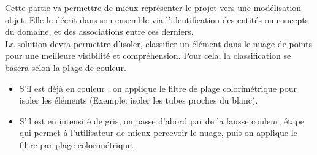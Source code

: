 \documentclass[12pt,titlepage,french]{article}
\begin{document}
Cette partie va permettre de mieux représenter le projet vers une modélisation objet. Elle le décrit dans son ensemble via l'identification des entités ou concepts du domaine, et des associations entre ces derniers. \\

La solution devra permettre d’isoler, classifier un élément dans le nuage de points pour une meilleure visibilité et compréhension. Pour cela, la classification se basera selon la plage de couleur.\\

\begin{itemize}
	\item  S'il est déjà en couleur : on applique le filtre de plage colorimétrique pour isoler les éléments (Exemple: isoler les tubes proches du blanc).\par

	\item  S'il est en intensité de gris, on passe d'abord par de la fausse couleur, étape qui permet à l'utilisateur de mieux percevoir le nuage, puis on applique le filtre par plage colorimétrique.\\ \par
\end{itemize}
\end{document}
